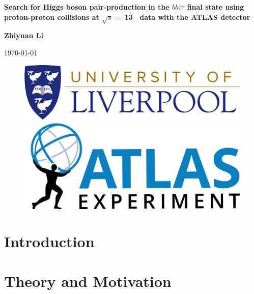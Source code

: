 \documentclass[twoside,11pt]{report}
\newcommand{\changefont}{\fontsize{9}{11}\selectfont}
\newcommand{\changefontbig}{\fontsize{12}{14}\selectfont}
\begin{document}
\fancyhead{}
\begin{titlepage}
	\centering
	{\LARGE \textbf{Search for Higgs boson pair-production in the $bb\tau\tau$ final state using proton-proton collisions at $\sqrt{s}$ = 13 \TeV\ data with the ATLAS detector} \par}
	\vspace{1cm}
	{\LARGE \textbf{Zhiyuan Li} \par}
	\vspace{0.2cm}
	\today
	\vspace{3cm}
	\begin{figure}[htp]
		\centering
		\includegraphics[width=.5\textwidth]{logo.png}
		\vspace{3em}
		\centering
		\includegraphics[width=.45\textwidth]{ATLAS-Logo-Ref-RGB-H_1.jpg}
		\end{figure}
\end{titlepage}

\tableofcontents{}
\printindex{}

\newpage
{}
\fancyhead[RE]{\changefont \rightmark}
\fancyhead[LO]{\changefontbig \textbf{\chaptername . \thechapter}}
\large
\chapter{Introduction}
\chapter{Theory and Motivation}
\end{document}
